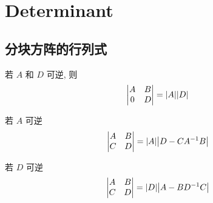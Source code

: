 \chapter{Determinant}
\label{determinant}

\section{分块方阵的行列式}

若 $A$ 和 $D$ 可逆, 则
\[
    \begin{vmatrix*}
        A & B \\
        0 & D
    \end{vmatrix*}
    =
    \abs*{A} \abs*{D}
\]

若 $A$ 可逆
\[
    \begin{vmatrix*}
        A & B \\
        C & D
    \end{vmatrix*}
    = \abs*{A} \abs*{D - CA^{-1} B}
\]

若 $D$ 可逆
\[
    \begin{vmatrix*}
        A & B \\
        C & D
    \end{vmatrix*}
    = \abs*{D} \abs*{A - BD^{-1} C}
\]


